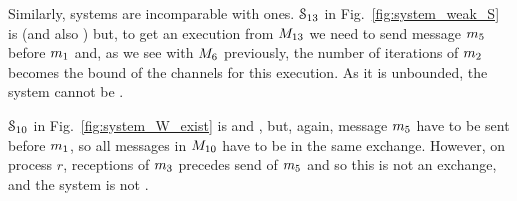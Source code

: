 %


%   

\begin{center}
  \begin{minipage}[c]{8cm}
    
    
\end{minipage}
\hspace*{1cm}
\begin{minipage}[c]{3.5cm}
  
\end{minipage}
\end{center}


Similarly, \sS{} systems are incomparable with \eb{} ones.
$\mathcal{S}_{13}$ in Fig.~\ref{fig:system_weak_S} is \sS{} (and also )
but, to get an execution from $M_{13}$ we need to send message $m_5$ before $m_1$ and, as we see with $M_6$ previously, the number of iterations of $m_2$ becomes the bound of the channels for this execution. As it is unbounded, the system cannot be \eb{}.

\begin{center}
  \begin{minipage}[c]{8cm}
    
\end{minipage}
\hspace*{1cm}
\begin{minipage}[c]{3.5cm}
  
\end{minipage}
\end{center}


$\mathcal{S}_{10}$ in Fig.~\ref{fig:system_W_exist} is \eb{} and \wS{}, but, again, message $m_5$ have to be sent before $m_1$, so all messages in $M_{10}$ have to be in the same exchange. However, on process $r$, receptions of $m_3$ precedes send of $m_5$ and so this is not an exchange, and the system is not \sS{}.

